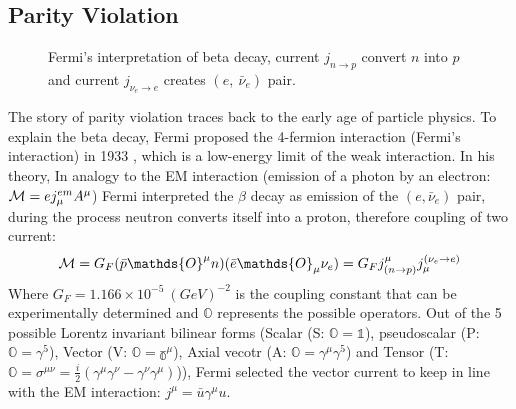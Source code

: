 \subsection{Parity Violation}
\begin{figure}[H]
    \centering
    \caption{Fermi's interpretation of beta decay, current $j_{n \rightarrow p}$ 
    convert $n$ into $p$ and current $j_{\nu_e \rightarrow e}$ creates $(e, \ \bar{\nu}_e) $
    pair.}
\end{figure}
The story of parity violation traces back to the early age of particle physics. 
To explain the beta decay, Fermi proposed the 4-fermion interaction 
(Fermi's interaction) in 1933 \cite{Fermi1934}, which is a low-energy limit of the 
weak interaction. In his theory, In analogy to the EM interaction (emission of a
photon by an electron: $\mathcal{M} = ej_\mu^{em} A^\mu$) Fermi interpreted the $\beta$
decay as emission of the $(e, \bar{\nu}_e)$ pair, during the process neutron converts
itself into a proton, therefore coupling of two current:
\begin{equation}
    \CM = G_F (\bar{p} \mathds{O}^\mu n)(\bar{e} \mathds{O}_\mu \nu_e) 
	= G_F j^\mu_{(n\rightarrow p)} j_\mu^{(\nu_e\rightarrow e)}
\end{equation}
Where $G_F = 1.166 \times 10^{-5} \ (GeV)^{-2}$ is the coupling constant that 
can be experimentally determined and $\mathds{O}$ represents 
the possible operators. Out of the 5 possible Lorentz invariant bilinear forms 
(Scalar (S: $\mathds{O} = \mathds{1}$), pseudoscalar (P: $\mathds{O} = \gamma^5$), 
Vector (V: $\mathds{O} = \mathds{\gamma^\mu}$), Axial vecotr (A: $\mathds{O} = \gamma^\mu\gamma^5$) 
and Tensor (T: $\mathds{O}=\sigma^{\mu\nu} = \frac{i}{2}(\gamma^\mu\gamma^\nu - \gamma^\nu\gamma^\mu)$)),
Fermi selected the vector current to keep in line with the EM interaction:
$j^\mu = \bar{u} \gamma^\mu u$.

